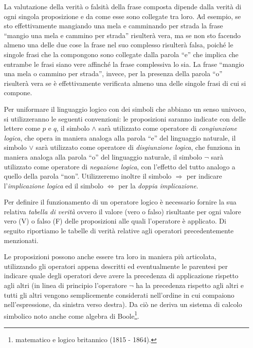La valutazione della verità o falsità della frase composta dipende dalla verità di ogni singola proposizione e da come esse sono collegate tra loro. Ad esempio, se sto effettivamente mangiando una mela e camminando per strada la frase ``mangio una mela e cammino per strada'' risulterà vera, ma se non sto facendo almeno una delle due cose la frase nel suo complesso risulterà falsa, poiché le singole frasi che la compongono sono collegate dalla parola ``e'' che implica che entrambe le frasi siano vere affinché la frase complessiva lo sia. La frase ``mangio una mela o cammino per strada'', invece, per la presenza della parola ``o'' risulterà vera se è effettivamente verificata almeno una delle singole frasi di cui si compone.

Per uniformare il linguaggio logico con dei simboli che abbiano un senso univoco, si utilizzeranno le seguenti convenzioni: le proposizioni saranno indicate con delle lettere come $p$ e $q$, il simbolo $\wedge$ sarà utilizzato come operatore di \emph{congiunzione logica}, che opera in maniera analoga alla parola ``e'' del linguaggio naturale, il simbolo $\vee$ sarà utilizzato come operatore di \emph{disgiunzione logica}, che funziona in maniera analoga alla parola ``o'' del linguaggio naturale, il simbolo $\neg$ sarà utilizzato come operatore di \emph{negazione logica}, con l'effetto del tutto analogo a quello della parola ``non''.
Utilizzeremo inoltre il simbolo $\Rightarrow$ per indicare l'\emph{implicazione logica} ed il simbolo $\Leftrightarrow$ per la \emph{doppia implicazione}.

Per definire il funzionamento di un operatore logico è necessario fornire la sua relativa \emph{tabella di verità} ovvero il valore (vero o falso) risultante per ogni valore vero (V) o falso (F) delle proposizioni alle quali l'operatore è applicato. Di seguito riportiamo le tabelle di verità relative agli operatori precedentemente menzionati.

\begin{center}
 
\end{center}

Le proposizioni possono anche essere tra loro in maniera più articolata, utilizzando gli operatori appena descritti ed eventualmente le parentesi per indicare quale degli operatori deve avere la precedenza di applicazione rispetto agli altri (in linea di principio l'operatore $\neg$ ha la precedenza rispetto agli altri e tutti gli altri vengono semplicemente considerati nell'ordine in cui compaiono nell'espressione, da sinistra verso destra). Da ciò ne deriva un sistema di calcolo simbolico noto anche come algebra di Boole\footnote{matematico e logico britannico (1815 - 1864).}.

